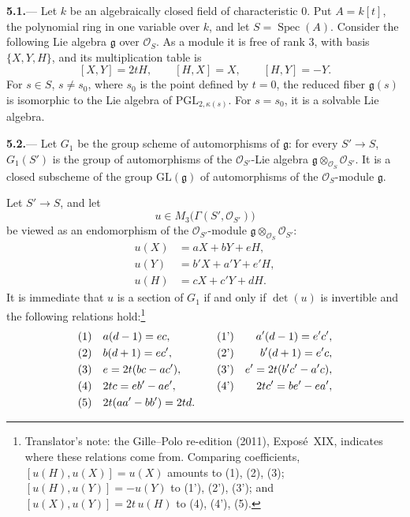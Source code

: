 
\par\medskip\noindent
\textbf{5.1.}---
Let \(k\) be an algebraically closed field of characteristic \(0\).
Put \(A=k[t]\), the polynomial ring in one variable over \(k\), and
let \(S=\operatorname{Spec}(A)\).  Consider the following Lie algebra
\(\mathfrak g\) over \(\mathcal O_S\).  As a module it is free of
rank \(3\), with basis \(\{X,Y,H\}\), and its multiplication table is
\[
  [X,Y]=2tH,
  \qquad
  [H,X]=X,
  \qquad
  [H,Y]=-Y.
\]
For \(s\in S\), \(s\ne s_0\), where \(s_0\) is the point defined by
\(t=0\), the reduced fiber \(\mathfrak g(s)\) is isomorphic to the Lie algebra of
\(\mathrm{PGL}_{2,\kappa(s)}\).  For \(s=s_0\), it is a solvable Lie
algebra.

\par\medskip\noindent
\textbf{5.2.}---
Let \(G_1\) be the group scheme of automorphisms of \(\mathfrak g\):
for every \(S'\to S\), \(G_1(S')\) is the group of automorphisms of
the \(\mathcal O_{S'}\)-Lie algebra
\(\mathfrak g\otimes_{\mathcal O_S}\mathcal O_{S'}\).  It is a closed
subscheme of the group \(\mathrm{GL}(\mathfrak g)\) of automorphisms
of the \(\mathcal O_S\)-module \(\mathfrak g\).

Let \(S'\to S\), and let
\[
  u\in M_3\bigl(\Gamma(S',\mathcal O_{S'})\bigr)
\]
be viewed as an endomorphism of the \(\mathcal O_{S'}\)-module
\(\mathfrak g\otimes_{\mathcal O_S}\mathcal O_{S'}\):
\[
  \begin{aligned}
  u(X)&=aX+bY+eH,\\
  u(Y)&=b'X+a'Y+e'H,\\
  u(H)&=cX+c'Y+dH.
  \end{aligned}
\]
It is immediate that \(u\) is a section of \(G_1\) if and only if
\(\det(u)\) is invertible and the following relations hold:\footnote{Translator's note: the Gille--Polo re-edition (2011), Exposé~XIX, indicates
where these relations come from. Comparing coefficients,
\([u(H),u(X)]=u(X)\) amounts to (1), (2), (3); \([u(H),u(Y)]=-u(Y)\) to (1'),
(2'), (3'); and \([u(X),u(Y)]=2t\,u(H)\) to (4), (4'), (5).}
\[
\begin{alignedat}{4}
  \textup{(1)}\quad&a(d-1)=ec,
  &\qquad&
  \textup{(1')}\quad&a'(d-1)=e'c',\\
  \textup{(2)}\quad&b(d+1)=ec',
  &&
  \textup{(2')}\quad&b'(d+1)=e'c,\\
  \textup{(3)}\quad&e=2t(bc-ac'),
  &&
  \textup{(3')}\quad&e'=2t(b'c'-a'c),\\
  \textup{(4)}\quad&2tc=eb'-ae',
  &&
  \textup{(4')}\quad&2tc'=be'-ea',\\
  \textup{(5)}\quad&2t(aa'-bb')=2td.&&&
\end{alignedat}
\]

